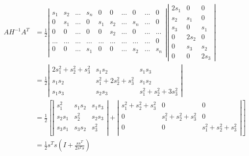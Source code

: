 \begin{align*} 
A H^{-1}A^T &= \frac{1}{2} \left| \begin{array}{cccc|cccc|c|c}
s_1 & s_2 & . . . & s_n & 0 & 0 & . . . & 0 & . . . & 0\\
 0 & s_1 & . . . & 0 & s_1 & s_2 & . . . & s_n &. . . & 0\\
 0 & 0 & . . . & 0 & 0 & s_2& . . . & 0 &. . . & . . . \\ 
 . . . & . . . & . . . & . . . &  . . . & . . . & . . . & . . . & . . .  & 0 \\
  0 & 0 & . . . & s_1 & 0 & 0 & . . . & s_2 &. . . & s_n\\ 
\end{array} \right| \left| \begin{array}{ccc}
2s_1 & 0 & 0 \\
s_2 & s_1 & 0 \\
s_3 & 0 & s_1 \\
0& 2s_2 & 0 \\
0 & s_3 & s_2 \\
0 & 0 & 2s_3
\end{array}\right | \\
&= \frac{1}{2} \left| \begin{array}{ccc}
2s_1^2 + s_2^2 + s_3^2 & s_1s_2 & s_1 s_3 \\
s_1s_2 & s_1^2 + 2s_2^2 + s_3^2 & s_1s_2 \\
s_1s_3 & s_2 s_3 & s_1^2 + s_2^2 + 3s_3^2
\end{array} \right | \\
&= \frac{1}{2} \left[\left| \begin{array}{ccc}
s_1^2 & s_1s_2 & s_1s_3 \\
s_2s_1 & s_2^2 & s_2s_3 \\
s_3s_1 & s_3s_2 & s_3^2 \\
\end{array}\right | + \left| \begin{array}{ccc}
s_1^2 + s_2^2 + s_3^2 & 0 & 0 \\
0 & s_1^2 + s_2^2 + s_3^2 & 0 \\
0 & 0 & s_1^2 + s_2^2 + s_3^2\\
\end{array} \right | \right] \\
&= \frac{1}{2}s^Ts\left(I + \frac{ss^T}{2s^Ts}\right)
\end{align*}